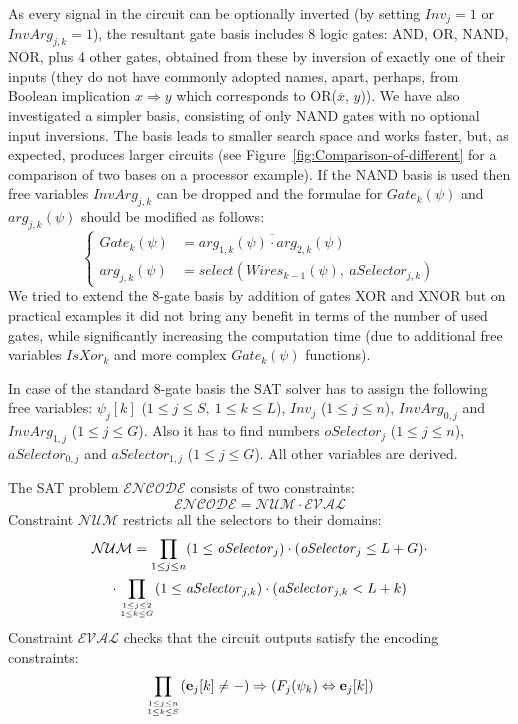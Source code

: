As every signal in the circuit can be optionally inverted (by setting
$\mathit{Inv}_{j}=1$ or $\mathit{InvArg}_{j,k}=1$), the resultant
gate basis includes 8 logic gates: AND, OR, NAND, NOR, plus 4 other
gates, obtained from these by inversion of exactly one of their inputs
(they do not have commonly adopted names, apart, perhaps, from Boolean
implication $x\Rightarrow y$ which corresponds to OR($\overline{x}$,
$y$)). We have also investigated a simpler basis, consisting of only
NAND gates with no optional input inversions. The basis leads to smaller
search space and works faster, but, as expected, produces larger circuits
(see Figure~\ref{fig:Comparison-of-different} for a comparison of
two bases on a processor example). If the NAND basis is used then
free variables $\mathit{InvArg}_{j,k}$ can be dropped and the formulae
for $\mathit{Gate}_{k}(\psi)$ and $\mathit{arg}_{j,k}(\psi)$ should
be modified as follows: 
\[
\begin{cases}
\mathit{Gate}_{k}(\psi) & =\overline{\mathit{arg}_{1,k}(\psi)\cdot\mathit{arg}_{2,k}(\psi)}\\
\mathit{arg}_{j,k}(\psi) & =select(\mathit{Wires}_{k-1}(\psi),\ \mathit{aSelector}_{j,k})
\end{cases}
\]
We tried to extend the 8-gate basis by addition of gates XOR and XNOR
but on practical examples it did not bring any benefit in terms of
the number of used gates, while significantly increasing the computation
time (due to additional free variables $\mathit{IsXor_{k}}$ and more
complex $\mathit{Gate}_{k}(\psi)$ functions).

In case of the standard 8-gate basis the SAT solver has to assign
the following free variables: $\psi_{j}[k]$ ($1\le j\le S,\ 1\le k\le L$),
$Inv_{j}$ ($1\le j\le n$), $\mathit{InvArg}_{0,j}$ and $\mathit{InvArg}_{1,j}$
($1\le j\le G$). Also it has to find numbers $\mathit{oSelector}_{j}$
($1\le j\le n$), $\mathit{aSelector}_{0,j}$ and $\mathit{aSelector}_{1,j}$
($1\le j\le G$). All other variables are derived.

The SAT problem $\mathcal{ENCODE}$ consists of two constraints:
\[
\mathcal{ENCODE}=\mathcal{NUM}\cdot\mathcal{EVAL}
\]
 Constraint $\mathcal{NUM}$ restricts all the selectors to their
domains:
\begin{multline}
\mathcal{NUM}=\prod_{1\le j\le n}(1\le\mathit{oSelector}_{j})\cdot(\mathit{oSelector}_{j}\le L+G)\cdot \\ \cdot\prod_{{1\le j\le2\atop 1\le k\le G}}(1\le\mathit{aSelector}_{j,k})\cdot(\mathit{aSelector}_{j,k}<L+k)
\end{multline}
Constraint $\mathcal{EVAL}$ checks that the circuit outputs satisfy
the encoding constraints:
\[
\prod_{{1\le j\le n\atop 1\le k\le S}}(\mathbf{e}_{j}[k]\neq-)\Rightarrow(F_{j}(\psi_{k})\Leftrightarrow\mathbf{e}_{j}[k])
\]


